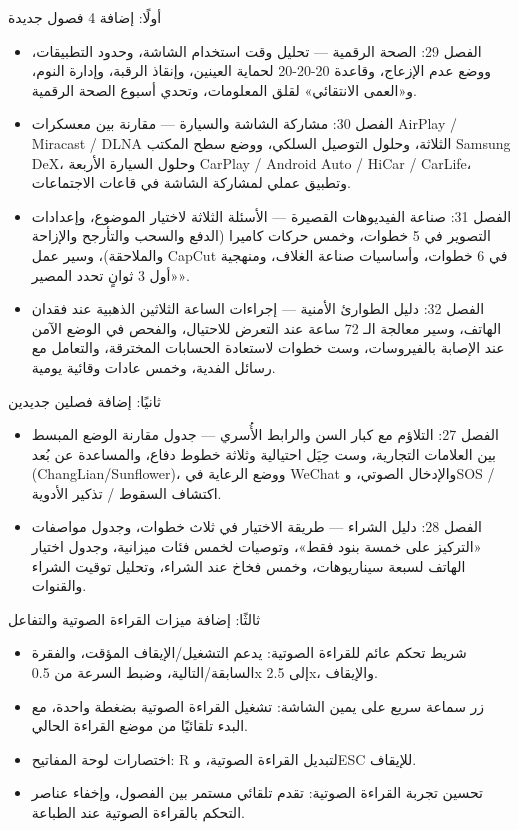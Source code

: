 
أولًا: إضافة 4 فصول جديدة

\begin{itemize}
  \item الفصل 29: الصحة الرقمية — تحليل وقت استخدام الشاشة، وحدود التطبيقات، ووضع عدم الإزعاج، وقاعدة 20-20-20 لحماية العينين، وإنقاذ الرقبة، وإدارة النوم، و«العمى الانتقائي» لقلق المعلومات، وتحدي أسبوع الصحة الرقمية.
  \item الفصل 30: مشاركة الشاشة والسيارة — مقارنة بين معسكرات AirPlay / Miracast / DLNA الثلاثة، وحلول التوصيل السلكي، ووضع سطح المكتب Samsung DeX، وحلول السيارة الأربعة CarPlay / Android Auto / HiCar / CarLife، وتطبيق عملي لمشاركة الشاشة في قاعات الاجتماعات.
  \item الفصل 31: صناعة الفيديوهات القصيرة — الأسئلة الثلاثة لاختيار الموضوع، وإعدادات التصوير في 5 خطوات، وخمس حركات كاميرا (الدفع والسحب والتأرجح والإزاحة والملاحقة)، وسير عمل CapCut في 6 خطوات، وأساسيات صناعة الغلاف، ومنهجية «أول 3 ثوانٍ تحدد المصير».
  \item الفصل 32: دليل الطوارئ الأمنية — إجراءات الساعة الثلاثين الذهبية عند فقدان الهاتف، وسير معالجة الـ 72 ساعة عند التعرض للاحتيال، والفحص في الوضع الآمن عند الإصابة بالفيروسات، وست خطوات لاستعادة الحسابات المخترقة، والتعامل مع رسائل الفدية، وخمس عادات وقائية يومية.
\end{itemize}

ثانيًا: إضافة فصلين جديدين

\begin{itemize}
  \item الفصل 27: التلاؤم مع كبار السن والرابط الأُسري — جدول مقارنة الوضع المبسط بين العلامات التجارية، وست حِيَل احتيالية وثلاثة خطوط دفاع، والمساعدة عن بُعد (ChangLian/Sunflower)، ووضع الرعاية في WeChat والإدخال الصوتي، وSOS / اكتشاف السقوط / تذكير الأدوية.
  \item الفصل 28: دليل الشراء — طريقة الاختيار في ثلاث خطوات، وجدول مواصفات «التركيز على خمسة بنود فقط»، وتوصيات لخمس فئات ميزانية، وجدول اختيار الهاتف لسبعة سيناريوهات، وخمس فخاخ عند الشراء، وتحليل توقيت الشراء والقنوات.
\end{itemize}

ثالثًا: إضافة ميزات القراءة الصوتية والتفاعل

\begin{itemize}
  \item شريط تحكم عائم للقراءة الصوتية: يدعم التشغيل/الإيقاف المؤقت، والفقرة السابقة/التالية، وضبط السرعة من 0.5x إلى 2.5x، والإيقاف.
  \item زر سماعة سريع على يمين الشاشة: تشغيل القراءة الصوتية بضغطة واحدة، مع البدء تلقائيًا من موضع القراءة الحالي.
  \item اختصارات لوحة المفاتيح: R لتبديل القراءة الصوتية، وESC للإيقاف.
  \item تحسين تجربة القراءة الصوتية: تقدم تلقائي مستمر بين الفصول، وإخفاء عناصر التحكم بالقراءة الصوتية عند الطباعة.
\end{itemize}

